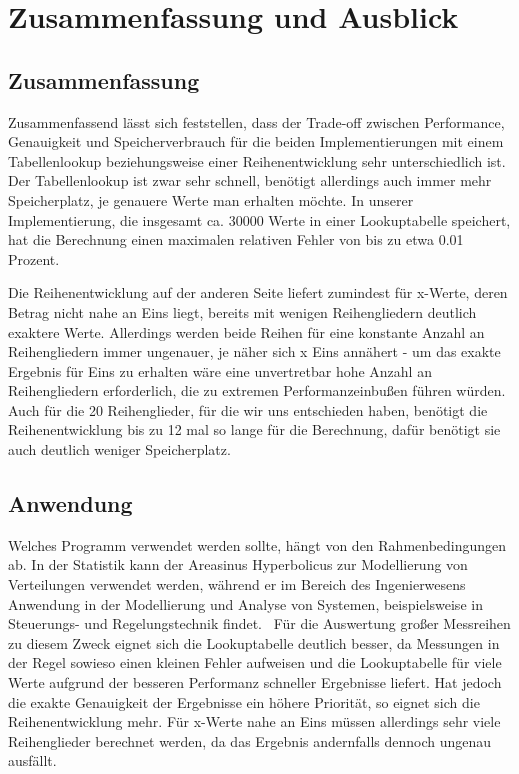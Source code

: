 \documentclass[course=erap] {aspdoc}
\begin{document}
    \section{Zusammenfassung und Ausblick}
    \subsection{Zusammenfassung}
    Zusammenfassend lässt sich feststellen, dass der Trade-off zwischen Performance, Genauigkeit und Speicherverbrauch für die beiden Implementierungen mit einem Tabellenlookup beziehungsweise einer Reihenentwicklung sehr unterschiedlich ist.
    Der Tabellenlookup ist zwar sehr schnell, benötigt allerdings auch immer mehr Speicherplatz, je genauere Werte man erhalten möchte.
    In unserer Implementierung, die insgesamt ca. 30000 Werte in einer Lookuptabelle speichert, hat die Berechnung einen maximalen relativen Fehler von bis zu etwa 0.01 Prozent.

    Die Reihenentwicklung auf der anderen Seite liefert zumindest für x-Werte, deren Betrag nicht nahe an Eins liegt, bereits mit wenigen Reihengliedern deutlich exaktere Werte.
    Allerdings werden beide Reihen für eine konstante Anzahl an Reihengliedern immer ungenauer, je näher sich x Eins annähert - um das exakte Ergebnis für Eins zu erhalten wäre eine unvertretbar hohe Anzahl an Reihengliedern erforderlich, die zu extremen Performanzeinbußen führen würden.
    Auch für die 20 Reihenglieder, für die wir uns entschieden haben, benötigt die Reihenentwicklung bis zu 12 mal so lange für die Berechnung, dafür benötigt sie auch deutlich weniger Speicherplatz.


    
    \subsection{Anwendung}
    Welches Programm verwendet werden sollte, hängt von den Rahmenbedingungen ab.
    In der Statistik kann der Areasinus Hyperbolicus zur Modellierung von Verteilungen verwendet werden, während er im Bereich des Ingenierwesens
    Anwendung in der Modellierung und Analyse von Systemen, beispielsweise in Steuerungs- und Regelungstechnik findet.~\cite{TODO}
    Für die Auswertung großer Messreihen zu diesem Zweck eignet sich die Lookuptabelle deutlich besser, da Messungen in der Regel sowieso einen kleinen Fehler aufweisen und die Lookuptabelle für viele Werte aufgrund der besseren Performanz schneller Ergebnisse liefert.
    Hat jedoch die exakte Genauigkeit der Ergebnisse ein höhere Priorität, so eignet sich die Reihenentwicklung mehr.
    Für x-Werte nahe an Eins müssen allerdings sehr viele Reihenglieder berechnet werden, da das Ergebnis andernfalls dennoch ungenau ausfällt.
\end{document}

